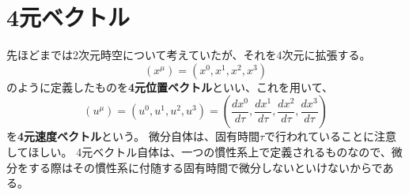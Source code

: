 \documentclass[a4paper]{jsreport}
\begin{document}
        \section{4元ベクトル}
            先ほどまでは2次元時空について考えていたが、それを4次元に拡張する。
            \begin{equation}
                (x^\mu) = (x^0, x^1, x^2, x^3)
            \end{equation}
            のように定義したものを\textbf{4元位置ベクトル}といい、これを用いて、
            \begin{equation}
                (u^\mu) = (u^0, u^1, u^2, u^3) = \left( \frac{dx^0}{d\tau}, \frac{dx^1}{d\tau}, \frac{dx^2}{d\tau}, \frac{dx^3}{d\tau} \right)
            \end{equation}
            を\textbf{4元速度ベクトル}という。
            微分自体は、固有時間$\tau$で行われていることに注意してほしい。
            4元ベクトル自体は、一つの慣性系上で定義されるものなので、微分をする際はその慣性系に付随する固有時間で微分しないといけないからである。
\end{document}
